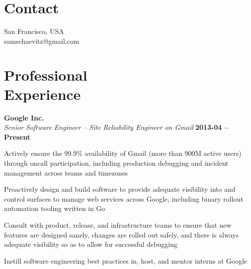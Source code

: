 \documentclass[margin,line]{resume}
\begin{document}
\begin{resume}

    \section{\mysidestyle Contact}

   San Francisco, USA             \\
   samschaevitz@gmail.com          \vspace{0mm}\\\vspace{-4.5mm}%

    \section{\mysidestyle Professional\\Experience}

    \textbf{Google Inc.} \vspace{1mm}\\\vspace{0mm}%
    \textsl{Senior Software Engineer -- Site Reliability Engineer on Gmail} \hfill \textbf{2013-04 -- Present}
    \begin{list2}
		\item Actively ensure the 99.9\% availability of Gmail (more than 900M active users) through oncall participation, including production debugging and incident management across teams and timezones
    \item Proactively design and build software to provide adequate visibility into and control surfaces to manage web services across Google, including binary rollout automation tooling written in Go
		\item Consult with product, release, and infrastructure teams to ensure that new features are designed sanely, changes are rolled out safely, and there is always adequate visibility so as to allow for successful debugging
    \item Instill software engineering best practices in, host, and mentor interns at Google
    \end{list2}\vspace{-0.5mm}


\end{resume}
\end{document}
